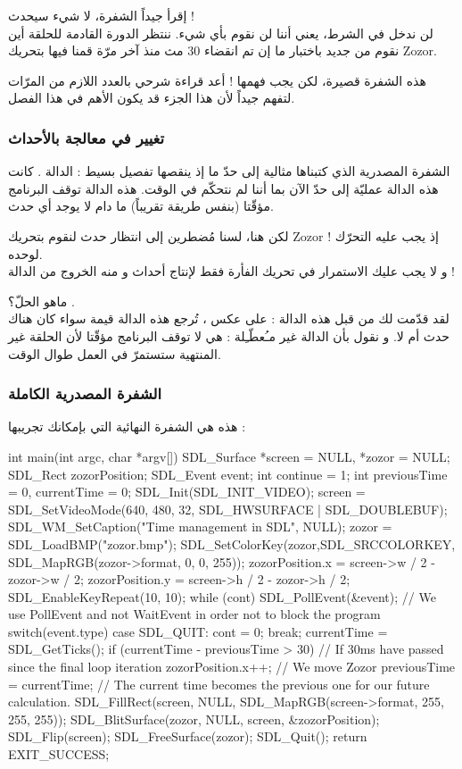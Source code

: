 إقرأ جيداً الشفرة، لا شيء سيحدث !\\
لن ندخل في الشرط، يعني أننا لن نقوم بأي شيء. ننتظر الدورة القادمة للحلقة أين نقوم من جديد باختبار ما إن تم انقضاء 30 مث منذ آخر مرّة قمنا فيها بتحريك 
\textenglish{Zozor}.

هذه الشفرة قصيرة، لكن يجب فهمها ! أعد قراءة شرحي بالعدد اللازم من المرّات لتفهم جيداً لأن هذا الجزء قد يكون الأهم في هذا الفصل.

\subsubsection{تغيير في معالجة بالأحداث}

الشفرة المصدرية الذي كتبناها مثالية إلى حدّ ما إذ ينقصها تفصيل بسيط : الدالة 
.
كانت هذه الدالة عمليّة إلى حدّ الآن بما أننا لم نتحكّم في الوقت. هذه الدالة توقف البرنامج مؤقّتا (بنفس طريقة
تقريباً) ما دام لا يوجد أي حدث.

لكن هنا، لسنا مُضطرين إلى انتظار حدث لنقوم بتحريك
\textenglish{Zozor} !
إذ يجب عليه التحرّك لوحده.\\
و لا يجب عليك الاستمرار في تحريك الفأرة فقط لإنتاج أحداث و منه الخروج من الدالة 
 !

ماهو الحلّ؟ 
.\\
لقد قدّمت لك من قبل هذه الدالة : على عكس
،
تُرجع هذه الدالة قيمة سواء كان هناك حدث أم لا. و نقول بأن الدالة غير مـُعطّـِلة : هي لا توقف البرنامج مؤقّتا لأن الحلقة غير المنتهية ستستمرّ في العمل طوال الوقت.

\subsubsection{الشفرة المصدرية الكاملة}

هذه هي الشفرة النهائية التي بإمكانك تجريبها :

\begin{Csource}
int main(int argc, char *argv[])
{
	SDL_Surface *screen = NULL, *zozor = NULL;
	SDL_Rect zozorPosition;
	SDL_Event event;
	int continue = 1;
	int previousTime = 0, currentTime = 0;
	SDL_Init(SDL_INIT_VIDEO);
	screen = SDL_SetVideoMode(640, 480, 32, SDL_HWSURFACE | SDL_DOUBLEBUF);
	SDL_WM_SetCaption("Time management in SDL", NULL);
	zozor = SDL_LoadBMP("zozor.bmp");
	SDL_SetColorKey(zozor,SDL_SRCCOLORKEY, SDL_MapRGB(zozor->format, 0, 0, 255));
	zozorPosition.x = screen->w / 2 - zozor->w / 2;
	zozorPosition.y = screen->h / 2 - zozor->h / 2;
	SDL_EnableKeyRepeat(10, 10);
	while (cont)
	{
		SDL_PollEvent(&event); // We use PollEvent and not WaitEvent in order not to block the program
		switch(event.type)
		{
			case SDL_QUIT:
			cont = 0;
			break;
		}
		currentTime = SDL_GetTicks();
		if (currentTime - previousTime > 30) // If 30ms have passed since the final loop iteration
		{
			zozorPosition.x++; // We move Zozor
			previousTime = currentTime; // The current time becomes the previous one for our future calculation.
		}
		SDL_FillRect(screen, NULL, SDL_MapRGB(screen->format, 255, 255, 255));
		SDL_BlitSurface(zozor, NULL, screen, &zozorPosition);
		SDL_Flip(screen);
	}
	SDL_FreeSurface(zozor);
	SDL_Quit();
	return EXIT_SUCCESS;
}
\end{Csource}

